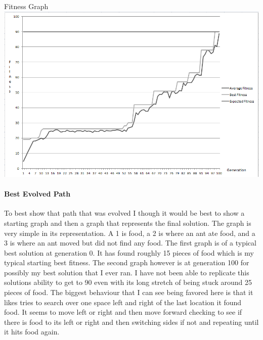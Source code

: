 \documentclass[11pt]{article} %
\begin{document}
\pagebreak
\begin{center}
Fitness Graph
\includegraphics[scale = 0.65]{Fitness_Graph}
\end{center}

\paragraph{Best Evolved Path} To best show that path that was evolved I though it would be best to show a starting graph and then a graph that represents the final solution. The graph is very simple in its representation. A 1 is food, a 2 is where an ant ate food, and a 3 is where an ant moved but did not find any food. The first graph is of a typical best solution at generation 0. It has found roughly 15 pieces of food which is my typical starting best fitness. The second graph however is at generation 100 for possibly my best solution that I ever ran. I have not been able to replicate this solutions ability to get to 90 even with its long stretch of being stuck around 25 pieces of food. The biggest behaviour that I can see being favored here is that it likes tries to search over one space left and right of the last location it found food. It seems to move left or right and then move forward checking to see if there is food to its left or right and then switching sides if not and repeating until it hits food again.
\end{document}
